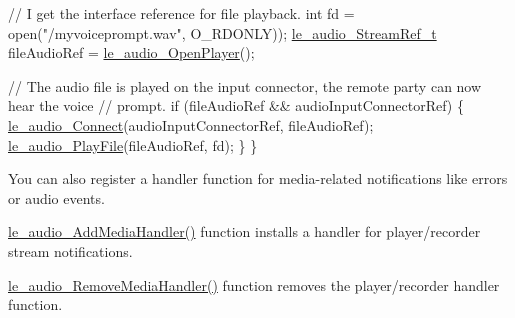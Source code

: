 \begin{DoxyCode}
    \textcolor{comment}{// I get the interface reference for file playback.}
    \textcolor{keywordtype}{int} fd = open(\textcolor{stringliteral}{"/myvoiceprompt.wav"}, O\_RDONLY));
    \hyperlink{le__audio__interface_8h_a9a46ff5a5afa61f1bc76120ab9e4da0a}{le\_audio\_StreamRef\_t} fileAudioRef = \hyperlink{le__audio__interface_8h_a92eb1b6377f50ff07b97c5b8546f01ec}{le\_audio\_OpenPlayer}();

    \textcolor{comment}{// The audio file is played on the input connector, the remote party can now hear the voice}
    \textcolor{comment}{// prompt.}
    \textcolor{keywordflow}{if} (fileAudioRef && audioInputConnectorRef)
    \{
        \hyperlink{le__audio__interface_8h_a338df65b2fb1ae0140d86880adbcf0de}{le\_audio\_Connect}(audioInputConnectorRef, fileAudioRef);
        \hyperlink{le__audio__interface_8h_aea2c5d0b394cfab87503639c534300c9}{le\_audio\_PlayFile}(fileAudioRef, fd);
    \}
\}
\end{DoxyCode}


You can also register a handler function for media-\/related notifications like errors or audio events.

\hyperlink{le__audio__interface_8h_a9996ac9d23333cf8219f28b69cac4f81}{le\+\_\+audio\+\_\+\+Add\+Media\+Handler()} function installs a handler for player/recorder stream notifications.

\hyperlink{le__audio__interface_8h_a60442c840a69155110ae878e03e16059}{le\+\_\+audio\+\_\+\+Remove\+Media\+Handler()} function removes the player/recorder handler function.

